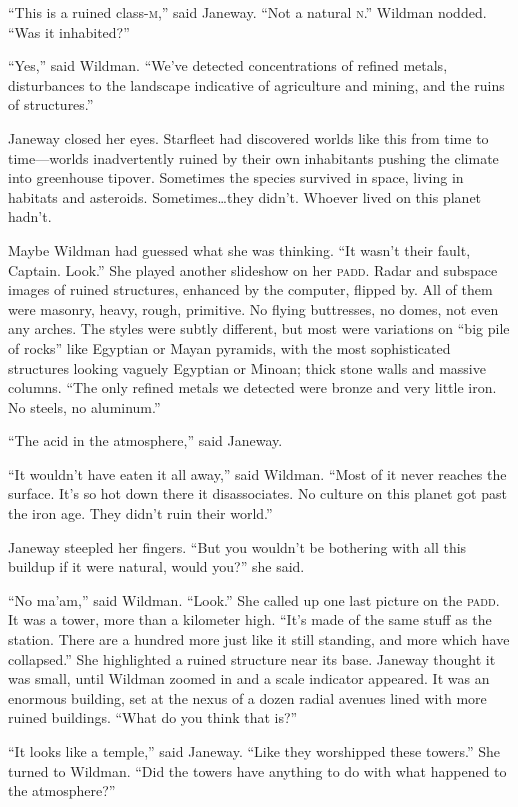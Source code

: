 \documentclass[twoside,letterpaper,12pt]{memoir}
\begin{document}
``This is a ruined class-\textsc{m},'' said Janeway. ``Not a natural \textsc{n}.'' Wildman nodded. ``Was it inhabited?''

``Yes,'' said Wildman. ``We've detected concentrations of refined metals, disturbances to the landscape indicative of agriculture and mining, and the ruins of structures.''

Janeway closed her eyes. Starfleet had discovered worlds like this from time to time---worlds inadvertently ruined by their own inhabitants pushing the climate into greenhouse tipover. Sometimes the species survived in space, living in habitats and asteroids. Sometimes\ldots they didn't. Whoever lived on this planet hadn't.

Maybe Wildman had guessed what she was thinking. ``It wasn't their fault, Captain. Look.'' She played another slideshow on her \textsc{padd}. Radar and subspace images of ruined structures, enhanced by the computer, flipped by. All of them were masonry, heavy, rough, primitive. No flying buttresses, no domes, not even any arches. The styles were subtly different, but most were variations on ``big pile of rocks'' like Egyptian or Mayan pyramids, with the most sophisticated structures looking vaguely Egyptian or Minoan; thick stone walls and massive columns. ``The only refined metals we detected were bronze and very little iron. No steels, no aluminum.''

``The acid in the atmosphere,'' said Janeway.

``It wouldn't have eaten it all away,'' said Wildman. ``Most of it never reaches the surface. It's so hot down there it disassociates. No culture on this planet got past the iron age. They didn't ruin their world.''

Janeway steepled her fingers. ``But you wouldn't be bothering with all this buildup if it were natural, would you?'' she said.

``No ma'am,'' said Wildman. ``Look.'' She called up one last picture on the \textsc{padd}. It was a tower, more than a kilometer high. ``It's made of the same stuff as the station. There are a hundred more just like it still standing, and more which have collapsed.'' She highlighted a ruined structure near its base. Janeway thought it was small, until Wildman zoomed in and a scale indicator appeared. It was an enormous building, set at the nexus of a dozen radial avenues lined with more ruined buildings. ``What do you think that is?''

``It looks like a temple,'' said Janeway. ``Like they worshipped these towers.'' She turned to Wildman. ``Did the towers have anything to do with what happened to the atmosphere?''
\end{document}
